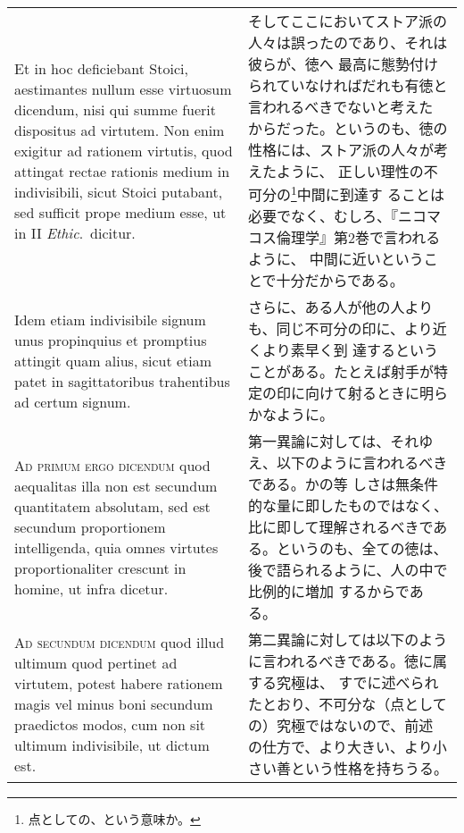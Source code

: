 \documentclass[10pt]{jsarticle}
\begin{document}
\begin{longtable}{p{21em}p{21em}}
 Et in hoc deficiebant Stoici, aestimantes nullum esse
 virtuosum dicendum, nisi qui summe fuerit dispositus ad virtutem. Non
 enim exigitur ad rationem virtutis, quod attingat rectae rationis
 medium in indivisibili, sicut Stoici putabant, sed sufficit prope
 medium esse, ut in II {\itshape Ethic}.~dicitur.
 
&

 そしてここにおいてストア派の人々は誤ったのであり、それは彼らが、徳へ
 最高に態勢付けられていなければだれも有徳と言われるべきでないと考えた
 からだった。というのも、徳の性格には、ストア派の人々が考えたように、
 正しい理性の不可分の\footnote{点としての、という意味か。}中間に到達す
 ることは必要でなく、むしろ、『ニコマコス倫理学』第2巻で言われるように、
 中間に近いということで十分だからである。

\\


 Idem etiam indivisibile signum unus propinquius et promptius attingit
 quam alius, sicut etiam patet in sagittatoribus trahentibus ad certum
 signum.
 
&

 さらに、ある人が他の人よりも、同じ不可分の印に、より近くより素早く到
 達するということがある。たとえば射手が特定の印に向けて射るときに明ら
 かなように。

\\



 {\scshape Ad primum ergo dicendum} quod aequalitas illa non est
 secundum quantitatem absolutam, sed est secundum proportionem
 intelligenda, quia omnes virtutes proportionaliter crescunt in
 homine, ut infra dicetur.


&

 第一異論に対しては、それゆえ、以下のように言われるべきである。かの等
 しさは無条件的な量に即したものではなく、比に即して理解されるべきであ
 る。というのも、全ての徳は、後で語られるように、人の中で比例的に増加
 するからである。

\\

 {\scshape Ad secundum dicendum} quod illud ultimum quod pertinet ad
 virtutem, potest habere rationem magis vel minus boni secundum
 praedictos modos, cum non sit ultimum indivisibile, ut dictum est.
 
&

 第二異論に対しては以下のように言われるべきである。徳に属する究極は、
 すでに述べられたとおり、不可分な（点としての）究極ではないので、前述
 の仕方で、より大きい、より小さい善という性格を持ちうる。


\end{longtable}
\end{document}
